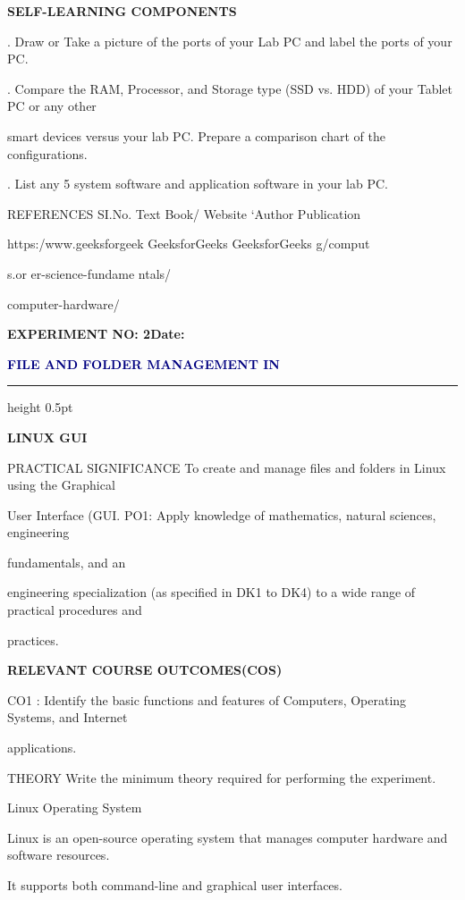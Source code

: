 \documentclass[10pt,a4paper]{article}
\newcommand{\expheading}[2]{%
  \vspace{0.1cm}\noindent\textbf{\large EXPERIMENT NO: #1}\hfill\textbf{Date: #2}\par
}
\newcommand{\exptitle}[1]{%
  \begin{center}\vspace{-2mm}\textcolor{navy}{\fontsize{20}{22}\selectfont\bfseries #1}\end{center}
  \vspace{1mm}\hrule height 0.5pt\vspace{3mm}
}
\begin{document}
\medskip\noindent\textbf{SELF-LEARNING COMPONENTS}\par
{}. Draw or Take a picture of the ports of your Lab PC and label the ports of your PC.\par
{}. Compare the RAM, Processor, and Storage type (SSD vs. HDD) of your Tablet PC or any other\par
\noindent smart devices versus your lab PC. Prepare a comparison chart of the configurations.\par
{}. List any 5 system software and application software in your lab PC.\par
\noindent REFERENCES SI.No. Text Book/ Website ‘Author Publication\par

                           https:/www.geeksforgeek   GeeksforGeeks      GeeksforGeeks g/comput\par
\noindent s.or                                         er-science-fundame ntals/\par
\noindent computer-hardware/\par
\clearpage
\expheading{2}{\underline{\hspace{1.8cm}}}
\exptitle{FILE AND FOLDER MANAGEMENT IN}
\medskip\noindent\textbf{LINUX GUI}\par
\noindent PRACTICAL SIGNIFICANCE To create and manage files and folders in Linux using the Graphical\par
\noindent User Interface (GUI. PO1: Apply knowledge of mathematics, natural sciences, engineering\par
\noindent fundamentals, and an\par
\noindent engineering specialization (as specified in DK1 to DK4) to a wide range of practical procedures and\par
\noindent practices.\par

\medskip\noindent\textbf{RELEVANT COURSE OUTCOMES(COS)}\par
\noindent CO1 : Identify the basic functions and features of Computers, Operating Systems, and Internet\par
\noindent applications.\par
\noindent THEORY Write the minimum theory required for performing the experiment.\par

\noindent Linux Operating System\par
\noindent Linux is an open-source operating system that manages computer hardware and software resources.\par
\noindent It supports both command-line and graphical user interfaces.\par
\end{document}
